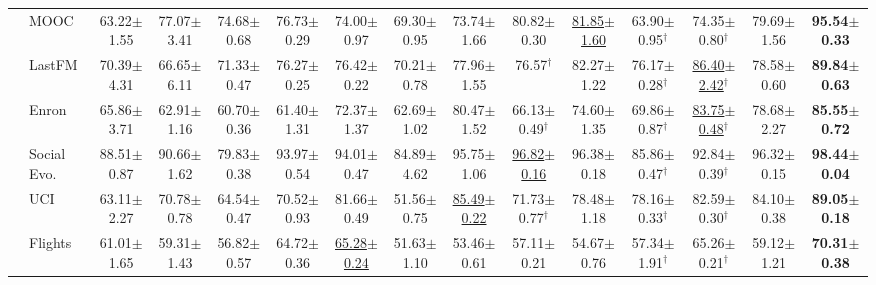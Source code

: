 \begin{table}[t]
{\begin{tabular}{llccccccccccccc}
 & MOOC & 63.22{\scriptsize$\pm$1.55} & 77.07{\scriptsize$\pm$3.41} & 74.68{\scriptsize$\pm$0.68} & 76.73{\scriptsize$\pm$0.29} & 74.00{\scriptsize$\pm$0.97} & 69.30{\scriptsize$\pm$0.95} & 73.74{\scriptsize$\pm$1.66} & 80.82{\scriptsize$\pm$0.30} & \underline{81.85{\scriptsize$\pm$1.60}} & 63.90{\scriptsize$\pm$0.95}$^\dagger$ & 74.35{\scriptsize$\pm$0.80}$^\dagger$ & 79.69{\scriptsize$\pm$1.56} & \textbf{95.54{\scriptsize$\pm$0.33}} \\
 & LastFM & 70.39{\scriptsize$\pm$4.31} & 66.65{\scriptsize$\pm$6.11} & 71.33{\scriptsize$\pm$0.47} & 76.27{\scriptsize$\pm$0.25} & 76.42{\scriptsize$\pm$0.22} & 70.21{\scriptsize$\pm$0.78} & 77.96{\scriptsize$\pm$1.55} & 76.57$^\dagger$ & 82.27{\scriptsize$\pm$1.22} & 76.17{\scriptsize$\pm$0.28}$^\dagger$ & \underline{86.40{\scriptsize$\pm$2.42}}$^\dagger$ & 78.58{\scriptsize$\pm$0.60} & \textbf{89.84{\scriptsize$\pm$0.63}} \\
 & Enron & 65.86{\scriptsize$\pm$3.71} & 62.91{\scriptsize$\pm$1.16} & 60.70{\scriptsize$\pm$0.36} & 61.40{\scriptsize$\pm$1.31} & 72.37{\scriptsize$\pm$1.37} & 62.69{\scriptsize$\pm$1.02} & 80.47{\scriptsize$\pm$1.52} & 66.13{\scriptsize$\pm$0.49}$^\dagger$ & 74.60{\scriptsize$\pm$1.35} & 69.86{\scriptsize$\pm$0.87}$^\dagger$ & \underline{83.75{\scriptsize$\pm$0.48}}$^\dagger$ & 78.68{\scriptsize$\pm$2.27} & \textbf{85.55{\scriptsize$\pm$0.72}} \\
 & Social Evo. & 88.51{\scriptsize$\pm$0.87} & 90.66{\scriptsize$\pm$1.62} & 79.83{\scriptsize$\pm$0.38} & 93.97{\scriptsize$\pm$0.54} & 94.01{\scriptsize$\pm$0.47} & 84.89{\scriptsize$\pm$4.62} & 95.75{\scriptsize$\pm$1.06} & \underline{96.82{\scriptsize$\pm$0.16}} & 96.38{\scriptsize$\pm$0.18} & 85.86{\scriptsize$\pm$0.47}$^\dagger$ & 92.84{\scriptsize$\pm$0.39}$^\dagger$ & 96.32{\scriptsize$\pm$0.15} & \textbf{98.44{\scriptsize$\pm$0.04}} \\
 & UCI & 63.11{\scriptsize$\pm$2.27} & 70.78{\scriptsize$\pm$0.78} & 64.54{\scriptsize$\pm$0.47} & 70.52{\scriptsize$\pm$0.93} & 81.66{\scriptsize$\pm$0.49} & 51.56{\scriptsize$\pm$0.75} & \underline{85.49{\scriptsize$\pm$0.22}} & 71.73{\scriptsize$\pm$0.77}$^\dagger$ & 78.48{\scriptsize$\pm$1.18} & 78.16{\scriptsize$\pm$0.33}$^\dagger$ & 82.59{\scriptsize$\pm$0.30}$^\dagger$ & 84.10{\scriptsize$\pm$0.38} & \textbf{89.05{\scriptsize$\pm$0.18}} \\
 & Flights & 61.01{\scriptsize$\pm$1.65} & 59.31{\scriptsize$\pm$1.43} & 56.82{\scriptsize$\pm$0.57} & 64.72{\scriptsize$\pm$0.36} & \underline{65.28{\scriptsize$\pm$0.24}} & 51.63{\scriptsize$\pm$1.10} & 53.46{\scriptsize$\pm$0.61} & 57.11{\scriptsize$\pm$0.21} & 54.67{\scriptsize$\pm$0.76} & 57.34{\scriptsize$\pm$1.91}$^\dagger$ & 65.26{\scriptsize$\pm$0.21}$^\dagger$ & 59.12{\scriptsize$\pm$1.21} & \textbf{70.31{\scriptsize$\pm$0.38}} \\

\end{tabular}}
\end{table}

